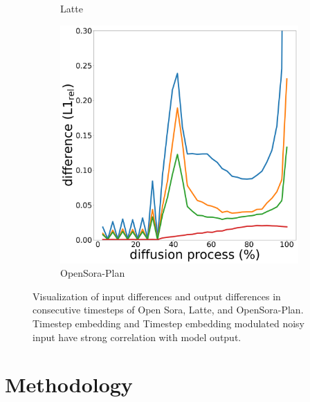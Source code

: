 \begin{figure}
\begin{minipage}{0.8\textwidth}
\begin{subfigure}{0.3\textwidth}
        \caption{Latte}
    \end{subfigure}
    \hfill
    \begin{subfigure}{0.3\textwidth}
        \centering
        \includegraphics[width=\textwidth]{figs/opensora_plan_inference_difference_crop_4.png} 
        \caption{OpenSora-Plan}
    \end{subfigure}
    \end{minipage}
    \vspace{-0.2cm}
    \caption{Visualization of input differences and output differences in consecutive timesteps of Open Sora, Latte, and OpenSora-Plan.
    Timestep embedding and Timestep embedding modulated noisy input have strong correlation with model output.}
    \label{fig:difference}
\end{figure}

\section{Methodology}



